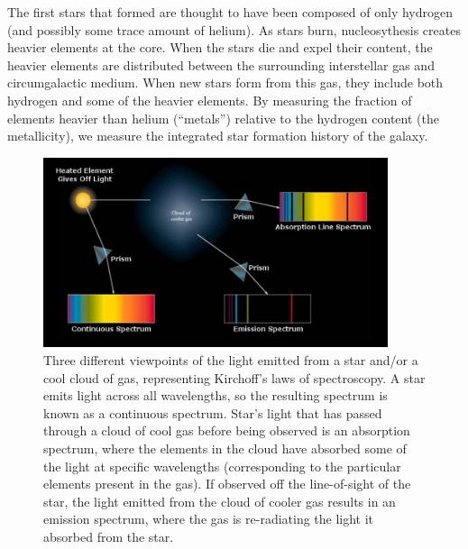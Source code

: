 The first stars that formed are thought to have been composed of only hydrogen 
(and possibly some trace amount of helium).  As stars burn, nucleosythesis 
creates heavier elements at the core.  When the stars die and expel their 
content, the heavier elements are distributed between the surrounding 
interstellar gas and circumgalactic medium.  When new stars form from this gas, 
they include both hydrogen and some of the heavier elements.  By measuring the 
fraction of elements heavier than helium (``metals'') relative to the hydrogen 
content (the metallicity), we measure the integrated star formation history of 
the galaxy.

\begin{figure}
    \includegraphics[width=0.9\textwidth]{Images/Intro/Kirchoff}
    \caption[Kirchoff's laws of spectroscopy]{Three different viewpoints of the 
    light emitted from a star and/or a cool cloud of gas, representing 
    Kirchoff's laws of spectroscopy.  A star emits light across all wavelengths, 
    so the resulting spectrum is known as a continuous spectrum.  Star's light 
    that has passed through a cloud of cool gas before being observed is an 
    absorption spectrum, where the elements in the cloud have absorbed some of 
    the light at specific wavelengths (corresponding to the particular elements 
    present in the gas).  If observed off the line-of-sight of the star, the 
    light emitted from the cloud of cooler gas results in an emission spectrum, 
    where the gas is re-radiating the light it absorbed from the star.}
    \label{fig:Kirchoff}
\end{figure}

